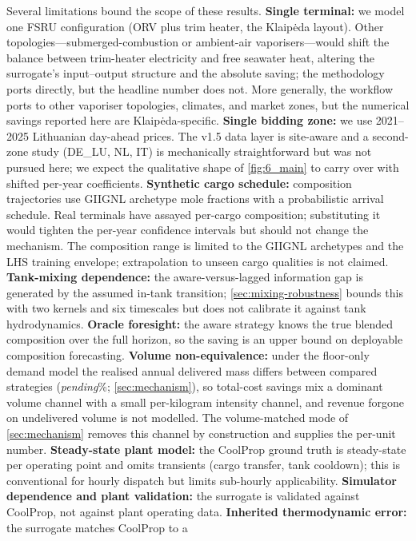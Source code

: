\documentclass[11pt]{article}
\providecommand{\lngDecompDeliveredMassDeltaPct}{\emph{pending}}
\begin{document}
Several limitations bound the scope of these results.
\textbf{Single terminal:} we model one FSRU configuration (ORV plus trim
heater, the Klaip\.eda layout). Other topologies---submerged-combustion or
ambient-air vaporisers---would shift the balance between trim-heater
electricity and free seawater heat, altering the surrogate's input--output
structure and the absolute saving; the methodology ports directly, but the
headline number does not. More generally, the workflow ports to other
vaporiser topologies, climates, and market zones, but the numerical savings
reported here are Klaip\.eda-specific. \textbf{Single bidding zone:} we use 2021--2025
Lithuanian day-ahead prices. The v1.5 data layer is site-aware and a
second-zone study (DE\_LU, NL, IT) is mechanically straightforward but was
not pursued here; we expect the qualitative shape of \cref{fig:6_main} to
carry over with shifted per-year coefficients. \textbf{Synthetic cargo
schedule:} composition trajectories use GIIGNL archetype mole fractions with
a probabilistic arrival schedule. Real terminals have assayed per-cargo
composition; substituting it would tighten the per-year confidence intervals
but should not change the mechanism. The composition range is limited to the
GIIGNL archetypes and the LHS training envelope; extrapolation to unseen cargo
qualities is not claimed. \textbf{Tank-mixing dependence:} the
aware-versus-lagged information gap is generated by the assumed in-tank
transition; \cref{sec:mixing-robustness} bounds this with two kernels and six
timescales but does not calibrate it against tank hydrodynamics.
\textbf{Oracle foresight:} the aware
strategy knows the true blended composition over the full horizon, so the
saving is an upper bound on deployable composition forecasting.
\textbf{Volume non-equivalence:} under the floor-only demand model the
realised annual delivered mass differs between compared strategies
(\lngDecompDeliveredMassDeltaPct\%; \cref{sec:mechanism}), so total-cost
savings mix a dominant volume channel with a small per-kilogram intensity
channel, and revenue forgone on undelivered volume is not modelled. The
volume-matched mode of \cref{sec:mechanism} removes this channel by
construction and supplies the per-unit number.
\textbf{Steady-state plant model:} the
CoolProp ground truth is steady-state per operating point and omits
transients (cargo transfer, tank cooldown); this is conventional for hourly
dispatch but limits sub-hourly applicability. \textbf{Simulator dependence and
plant validation:} the surrogate is validated against CoolProp, not against
plant operating data. \textbf{Inherited thermodynamic error:} the surrogate matches CoolProp to a
\end{document}
